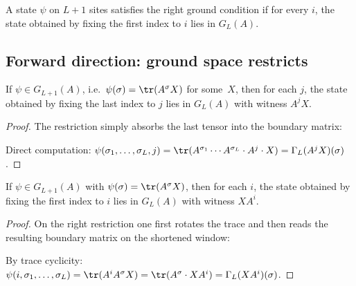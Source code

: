 \begin{definition}\label{def:in_right_ground}
    \leanok
    A state $\psi$ on $L+1$ sites satisfies the right ground condition if
    for every $i$, the state obtained by fixing the first index to $i$ lies in
    $G_L(A)$.
\end{definition}

\subsection{Forward direction: ground space restricts}

\begin{lemma}\label{lem:ground_space_in_left_ground}
    \leanok
    If $\psi \in G_{L+1}(A)$, i.e.\ $\psi(\sigma) = \tr(A^\sigma X)$ for some~$X$,
    then for each $j$, the state obtained by fixing the last index to $j$
    lies in $G_L(A)$ with witness $A^j X$.
\end{lemma}

\begin{proof}
    \leanok
    The restriction simply absorbs the last tensor into the boundary matrix:
    \begin{center}
    \end{center}
    Direct computation:
    $\psi(\sigma_1,\ldots,\sigma_L,j) = \tr(A^{\sigma_1}\cdots A^{\sigma_L} \cdot A^j \cdot X)
        = \Gamma_L(A^j X)(\sigma)$.
\end{proof}

\begin{lemma}\label{lem:ground_space_in_right_ground}
    \leanok
    If $\psi \in G_{L+1}(A)$ with $\psi(\sigma) = \tr(A^\sigma X)$, then
    for each $i$, the state obtained by fixing the first index to $i$
    lies in $G_L(A)$ with witness $X A^i$.
\end{lemma}

\begin{proof}
    \leanok
    On the right restriction one first rotates the trace and then reads the
    resulting boundary matrix on the shortened window:
    \begin{center}
    \end{center}
    By trace cyclicity:
    $\psi(i,\sigma_1,\ldots,\sigma_L) = \tr(A^i A^{\sigma} X)
        = \tr(A^{\sigma} \cdot X A^i) = \Gamma_L(X A^i)(\sigma)$.
\end{proof}

